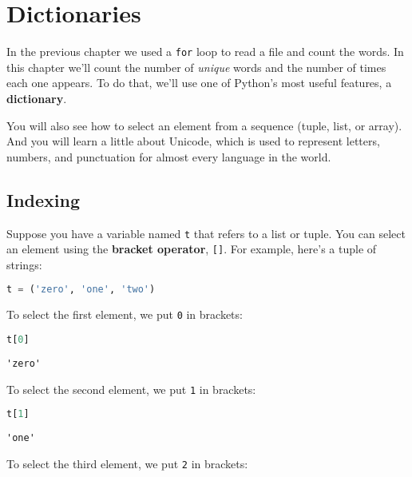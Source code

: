 \chapter{Dictionaries}\label{dictionaries}

In the previous chapter we used a \passthrough{\lstinline!for!} loop to
read a file and count the words. In this chapter we'll count the number
of \emph{unique} words and the number of times each one appears. To do
that, we'll use one of Python's most useful features, a
\textbf{dictionary}.

You will also see how to select an element from a sequence (tuple, list,
or array). And you will learn a little about Unicode, which is used to
represent letters, numbers, and punctuation for almost every language in
the world.

\section{Indexing}\label{indexing}

Suppose you have a variable named \passthrough{\lstinline!t!} that
refers to a list or tuple. You can select an element using the
\textbf{bracket operator}, \passthrough{\lstinline![]!}. For example,
here's a tuple of strings:

\begin{lstlisting}[language=Python,style=source]
t = ('zero', 'one', 'two')
\end{lstlisting}

To select the first element, we put \passthrough{\lstinline!0!} in
brackets:

\begin{lstlisting}[language=Python,style=source]
t[0]
\end{lstlisting}

\begin{lstlisting}[style=output]
'zero'
\end{lstlisting}

To select the second element, we put \passthrough{\lstinline!1!} in
brackets:

\begin{lstlisting}[language=Python,style=source]
t[1]
\end{lstlisting}

\begin{lstlisting}[style=output]
'one'
\end{lstlisting}

To select the third element, we put \passthrough{\lstinline!2!} in
brackets:

